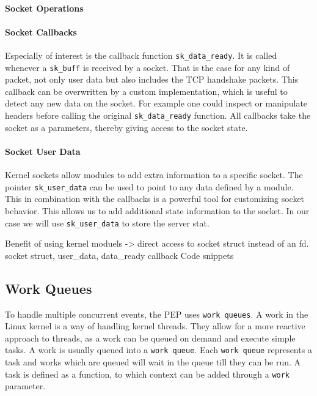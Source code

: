 \documentclass[a4paper,english, 11pt]{report}
\begin{document}
\paragraph{Socket Operations}

\paragraph{Socket Callbacks}
Especially of interest is the callback function \verb|sk_data_ready|. It is called whenever a \verb|sk_buff| is received by a socket. That is the case for any kind of packet, not only user data but also includes the TCP handshake packets. This callback can be overwritten by a custom implementation, which is useful to detect any new data on the socket. For example one could inspect or manipulate headers before calling the original \verb|sk_data_ready| function. All callbacks take the socket as a parameters, thereby giving access to the socket state. \\

\paragraph{Socket User Data}
Kernel sockets allow modules to add extra information to a specific socket. The pointer \verb|sk_user_data| can be used to point to any data defined by a module. This in combination with the callbacks is a powerful tool for customizing socket behavior. This allows us to add additional state information to the socket. In our case we will use \verb|sk_user_data| to store the server stat.

Benefit of using kernel moduels -> direct access to socket struct instead of an fd.
socket struct, user\_data, data\_ready callback
Code snippets

\subsection{Work Queues}
To handle multiple concurrent events, the PEP uses \verb|work queues|. A work in the Linux kernel is a way of handling kernel threads. They allow for a more reactive approach to threads, as a work can be queued on demand and execute simple tasks. A work is usually queued into a \verb|work queue|. Each \verb|work queue| represents a task and works which are queued will wait in the queue till they can be run. A task is defined as a function, to which context can be added through a \verb|work| parameter.\\
\end{document}
